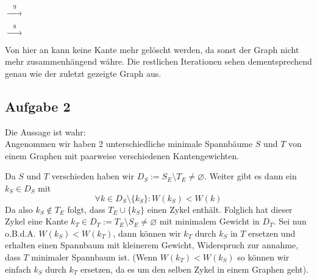 \documentclass[a4paper,graphics,11pt]{article}
\newcommand{\aufgabe}[1]{\subsection*{Aufgabe #1}}
\begin{document}
$\xrightarrow{\quad 9\quad}$
\begin{minipage}{0.43\textwidth}
\end{minipage}
$\xrightarrow{\quad 8\quad}$
\begin{minipage}{0.4\textwidth}
\end{minipage}

Von hier an kann keine Kante mehr gelöscht werden, da sonst der Graph nicht mehr zusammenhängend währe. Die restlichen
Iterationen sehen dementsprechend genau wie der zuletzt gezeigte Graph aus.

\newpage

\aufgabe{2}
Die Aussage ist wahr:\\
Angenommen wir haben 2 unterschiedliche minimale Spannbäume $S$ und $T$ von einem Graphen mit paarweise verschiedenen Kantengewichten.

Da $S$ und $T$ verschieden haben wir $D_S := S_E \setminus T_E \neq \varnothing$. Weiter gibt es dann ein $k_S \in D_S$ mit
$$
    \forall k \in D_S \setminus \{k_S\} : W(k_S) < W(k)
$$
Da also $k_S \notin T_E$ folgt, dass $T_E \cup \{k_S\}$ einen Zykel enthält.
Folglich hat dieser Zykel eine Kante $k_T \in D_T := T_E \setminus S_E \neq \varnothing$ mit minimalem Gewicht in $D_T$.
Sei nun o.B.d.A. $W(k_S) < W(k_T)$, dann können wir $k_T$ durch $k_S$ in $T$ ersetzen und erhalten einen Spannbaum mit kleinerem
Gewicht, Widerspruch zur annahme, dass $T$ minimaler Spannbaum ist. (Wenn $W(k_T) < W(k_S)$ so können wir einfach $k_S$ durch
$k_T$ ersetzen, da es um den selben Zykel in einem Graphen geht).
\end{document}

